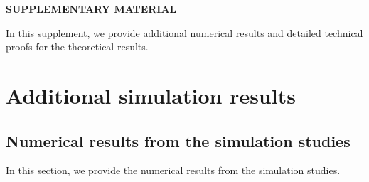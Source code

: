 \documentclass[12pt]{article}
\theoremstyle{plain}
\numberwithin{equation}{section}
\begin{document}
				
\clearpage
		\begin{center}
			{\large\bf SUPPLEMENTARY MATERIAL}
		\end{center}
		
In this supplement, we provide additional numerical results and detailed technical proofs for the theoretical results. 
			
			
		\setcounter{figure}{0} 
		\setcounter{table}{0}
		\setcounter{section}{0}  

\appendix


\section{Additional simulation results}\label{appendix_additionalnumericalresult}


\subsection{Numerical results from the simulation studies}

In this section, we provide the numerical results from the simulation studies. 
\end{document}
